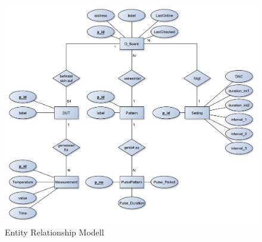 \begin{figure}[h]
\begin{center}
\includegraphics[width=\textwidth]{img/general/ER_Diagramm.pdf}
\caption{Entity Relationship Modell}
\label{ERM}
\end{center}
\end{figure}
